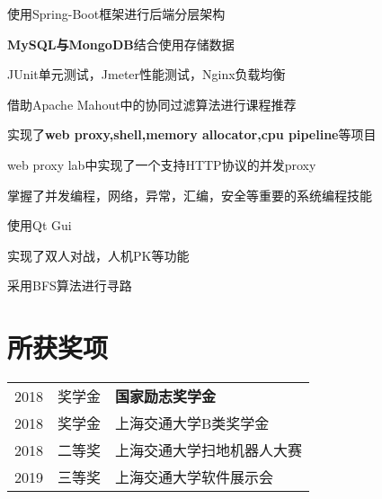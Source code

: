 \documentclass[]{deedy-resume-openfont}
\begin{document}
\begin{minipage}[t]{0.73\textwidth}
\begin{tightemize}
\item 使用Spring-Boot框架进行后端分层架构
\item  \textbf{MySQL与MongoDB}结合使用存储数据
\item JUnit单元测试，Jmeter性能测试，Nginx负载均衡
\item 借助Apache Mahout中的协同过滤算法进行课程推荐
\end{tightemize}
\sectionsep
\sectionsep

\begin{tightemize}
\item 实现了\textbf{web proxy,shell,memory allocator,cpu pipeline}等项目
\item web proxy lab中实现了一个支持HTTP协议的并发proxy
\item 掌握了并发编程，网络，异常，汇编，安全等重要的系统编程技能
\end{tightemize}
\sectionsep
\sectionsep

\begin{tightemize}
\item 使用Qt Gui
\item 实现了双人对战，人机PK等功能
\item 采用BFS算法进行寻路
\end{tightemize}
\sectionsep
\sectionsep






\section{所获奖项} 
\begin{tabular}{rll}
2018         & 奖学金  & \textbf{国家励志奖学金} \\
2018	     & 奖学金  & 上海交通大学B类奖学金 \\
2018	     & 二等奖  & 上海交通大学扫地机器人大赛 \\
2019         & 三等奖  & 上海交通大学软件展示会\\
\end{tabular}
\sectionsep


% 
% 

\end{minipage} 
\end{document}
